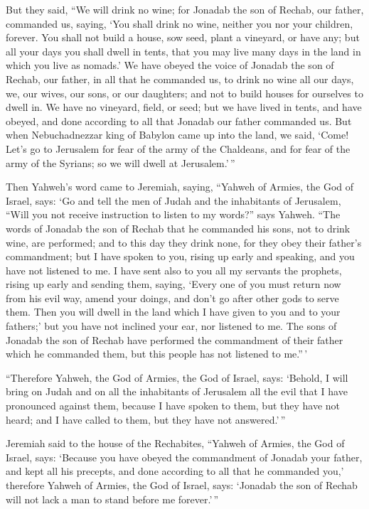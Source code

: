  But they said, ``We will drink no wine; for Jonadab the son
of Rechab, our father, commanded us, saying, `You shall drink no wine,
neither you nor your children, forever.  You shall not build
a house, sow seed, plant a vineyard, or have any; but all your days you
shall dwell in tents, that you may live many days in the land in which
you live as nomads.'  We have obeyed the voice of Jonadab
the son of Rechab, our father, in all that he commanded us, to drink no
wine all our days, we, our wives, our sons, or our daughters;
 and not to build houses for ourselves to dwell in. We have
no vineyard, field, or seed;  but we have lived in tents,
and have obeyed, and done according to all that Jonadab our father
commanded us.  But when Nebuchadnezzar king of Babylon came
up into the land, we said, `Come! Let's go to Jerusalem for fear of the
army of the Chaldeans, and for fear of the army of the Syrians; so we
will dwell at Jerusalem.'\,''

 Then Yahweh's word came to Jeremiah, saying, 
``Yahweh of Armies, the God of Israel, says: `Go and tell the men of
Judah and the inhabitants of Jerusalem, ``Will you not receive
instruction to listen to my words?'' says Yahweh.  ``The
words of Jonadab the son of Rechab that he commanded his sons, not to
drink wine, are performed; and to this day they drink none, for they
obey their father's commandment; but I have spoken to you, rising up
early and speaking, and you have not listened to me.  I
have sent also to you all my servants the prophets, rising up early and
sending them, saying, `Every one of you must return now from his evil
way, amend your doings, and don't go after other gods to serve them.
Then you will dwell in the land which I have given to you and to your
fathers;' but you have not inclined your ear, nor listened to me.
 The sons of Jonadab the son of Rechab have performed the
commandment of their father which he commanded them, but this people has
not listened to me.''\,'

 ``Therefore Yahweh, the God of Armies, the God of Israel,
says: `Behold, I will bring on Judah and on all the inhabitants of
Jerusalem all the evil that I have pronounced against them, because I
have spoken to them, but they have not heard; and I have called to them,
but they have not answered.'\,''

 Jeremiah said to the house of the Rechabites, ``Yahweh of
Armies, the God of Israel, says: `Because you have obeyed the
commandment of Jonadab your father, and kept all his precepts, and done
according to all that he commanded you,'  therefore Yahweh
of Armies, the God of Israel, says: `Jonadab the son of Rechab will not
lack a man to stand before me forever.'\,''

